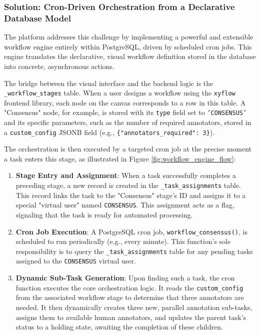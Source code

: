 \subsubsection{Solution: Cron-Driven Orchestration from a Declarative Database Model}
The platform addresses this challenge by implementing a powerful and extensible workflow engine entirely within PostgreSQL, driven by scheduled cron jobs. This engine translates the declarative, visual workflow definition stored in the database into concrete, asynchronous actions.

The bridge between the visual interface and the backend logic is the \texttt{\_workflow\_stages} table. When a user designs a workflow using the \texttt{xyflow} frontend library, each node on the canvas corresponds to a row in this table. A "Consensus" node, for example, is stored with its \texttt{type} field set to \texttt{'CONSENSUS'} and its specific parameters, such as the number of required annotators, stored in a \texttt{custom\_config} JSONB field (e.g., \texttt{\{"annotators\_required": 3\}}).

The orchestration is then executed by a targeted cron job at the precise moment a task enters this stage, as illustrated in Figure \ref{fig:workflow_engine_flow}:
\begin{enumerate}
    \item \textbf{Stage Entry and Assignment}: When a task successfully completes a preceding stage, a new record is created in the \texttt{\_task\_assignments} table. This record links the task to the "Consensus" stage's ID and assigns it to a special "virtual user" named \texttt{CONSENSUS}. This assignment acts as a flag, signaling that the task is ready for automated processing.

    \item \textbf{Cron Job Execution}: A PostgreSQL cron job, \texttt{workflow\_consensus()}, is scheduled to run periodically (e.g., every minute). This function's sole responsibility is to query the \texttt{\_task\_assignments} table for any pending tasks assigned to the \texttt{CONSENSUS} virtual user.

    \item \textbf{Dynamic Sub-Task Generation}: Upon finding such a task, the cron function executes the core orchestration logic. It reads the \texttt{custom\_config} from the associated workflow stage to determine that three annotators are needed. It then dynamically creates three new, parallel annotation sub-tasks, assigns them to available human annotators, and updates the parent task's status to a holding state, awaiting the completion of these children.
\end{enumerate}

